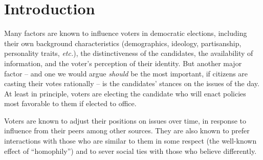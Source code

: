 \section{Introduction}
\label{sec:intro}

Many factors are known to influence voters in democratic elections, including
their own background characteristics (demographics, ideology, partisanship,
personality traits, \textit{etc.}), the distinctiveness of the candidates, the
availability of information, and the voter's perception of their
identity.\cite[pp.3-4]{redlawsk_citizens_2020} But another major factor -- and
one we would argue \textit{should} be the most important, if citizens are
casting their votes rationally -- is the candidates' stances on the issues of
the day. At least in principle, voters are electing the candidate who will
enact policies most favorable to them if elected to office.

Voters are known to adjust their positions on issues over time, in response to
influence from their
peers\cite{dandekar_biased_2013,mcpherson_birds_2001,mas_differentiation_2013}
among other sources. They are also known to prefer interactions with those who
are similar to them in some respect (the well-known effect of
``homophily''\cite{boucher_structural_2015,centola_homophily_2007}) and
to sever social ties with those who believe
differently\cite{skoric_what_2018,paik_defriending_2023}.

